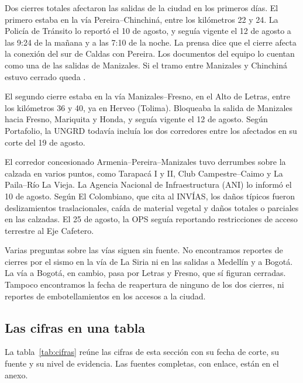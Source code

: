 Dos cierres totales afectaron las salidas de la ciudad en los primeros días. El primero estaba en la vía Pereira–Chinchiná, entre los kilómetros 22 y 24. La Policía de Tránsito lo reportó el 10 de agosto, y seguía vigente el 12 de agosto a las 9:24 de la mañana y a las 7:10 de la noche. La prensa dice que el cierre afecta la conexión del sur de Caldas con Pereira. Los documentos del equipo lo cuentan como una de las salidas de Manizales. Si el tramo entre Manizales y Chinchiná estuvo cerrado queda \porverificar.

El segundo cierre estaba en la vía Manizales–Fresno, en el Alto de Letras, entre los kilómetros 36 y 40, ya en Herveo (Tolima). Bloqueaba la salida de Manizales hacia Fresno, Mariquita y Honda, y seguía vigente el 12 de agosto. Según Portafolio, la UNGRD todavía incluía los dos corredores entre los afectados en su corte del 19 de agosto.

El corredor concesionado Armenia–Pereira–Manizales tuvo derrumbes sobre la calzada en varios puntos, como Tarapacá I y II, Club Campestre–Caimo y La Paila–Río La Vieja. La Agencia Nacional de Infraestructura (ANI) lo informó el 10 de agosto. Según El Colombiano, que cita al INVÍAS, los daños típicos fueron deslizamientos traslacionales, caída de material vegetal y daños totales o parciales en las calzadas. El 25 de agosto, la OPS seguía reportando restricciones de acceso terrestre al Eje Cafetero.

Varias preguntas sobre las vías siguen sin fuente. No encontramos reportes de cierres por el sismo en la vía de La Siria ni en las salidas a Medellín y a Bogotá. La vía a Bogotá, en cambio, pasa por Letras y Fresno, que sí figuran cerradas. Tampoco encontramos la fecha de reapertura de ninguno de los dos cierres, ni reportes de embotellamientos en los accesos a la ciudad.

\subsection{Las cifras en una tabla}

La tabla~\ref{tab:cifras} reúne las cifras de esta sección con su fecha de corte, su fuente y su nivel de evidencia. Las fuentes completas, con enlace, están en el anexo.

